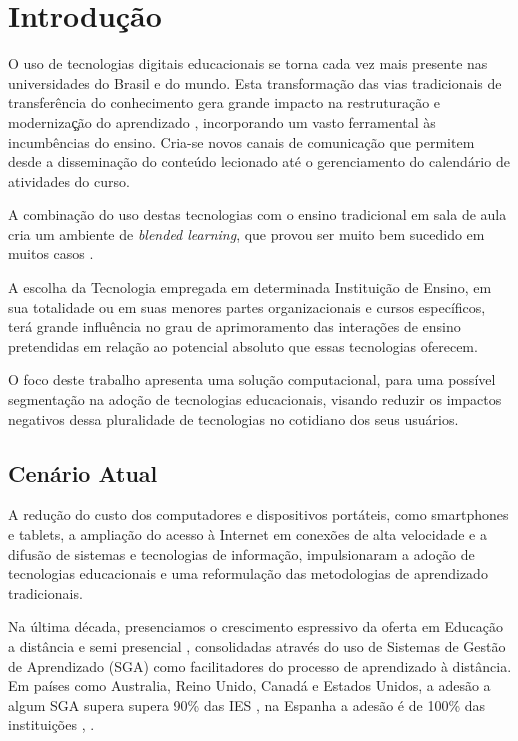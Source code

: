 
\chapter{Introdução}
\thispagestyle{empty} %

O uso de tecnologias digitais educacionais se torna cada vez mais presente nas universidades do Brasil e do mundo. Esta transformação das vias tradicionais de transferência do conhecimento gera grande impacto na restruturação e modernizaç̧ão do aprendizado \cite{book:peters}, incorporando um vasto ferramental às incumbências do ensino. Cria-se novos canais de comunicação que permitem desde a disseminação do conteúdo lecionado até o gerenciamento do calendário de atividades do curso.

A combinação do uso destas tecnologias com o ensino tradicional em sala de aula cria um ambiente de \textit{blended learning}, que provou ser muito bem sucedido em muitos casos \cite{article:kudumovic}.

A escolha da Tecnologia empregada em determinada Instituição de Ensino, em sua totalidade ou em suas menores partes organizacionais e cursos específicos, terá grande influência no grau de aprimoramento das interações de ensino pretendidas em relação ao potencial absoluto que essas tecnologias oferecem.

O foco deste trabalho apresenta uma solução computacional, para uma possível segmentação na adoção de tecnologias educacionais, visando reduzir os impactos negativos dessa pluralidade de tecnologias no cotidiano dos seus usuários.


\section{Cenário Atual}

A redução do custo dos computadores e dispositivos portáteis, como smartphones e tablets, a ampliação do acesso à Internet em conexões de alta velocidade e a difusão de sistemas e tecnologias de informação, impulsionaram a adoção de tecnologias educacionais e uma reformulação das metodologias de aprendizado tradicionais.

Na última década, presenciamos o crescimento espressivo da oferta em Educação a distância e semi presencial \cite{website:market_elearning}, consolidadas através do uso de Sistemas de Gestão de Aprendizado (SGA) como facilitadores do processo de aprendizado à distância. 		 	 	 		
Em países como Australia, Reino Unido, Canadá e Estados Unidos, a adesão a algum SGA supera supera 90\% das IES \cite{article:hawkins}\cite{book:browne}, na Espanha a adesão é de 100\% das instituições \cite{article:prendes}, .

